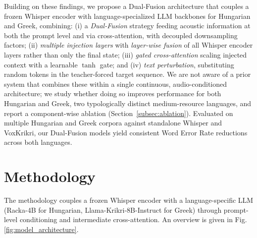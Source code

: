 \documentclass{article}
\begin{document}
Building on these findings, we propose a Dual-Fusion architecture that couples a frozen Whisper encoder with language-specialized LLM backbones for Hungarian and Greek, combining: (i) a \textit{Dual-Fusion} strategy feeding acoustic information at both the prompt level and via cross-attention, with decoupled downsampling factors; (ii) \textit{multiple injection layers} with \textit{layer-wise fusion} of all Whisper encoder layers rather than only the final state; (iii) \textit{gated cross-attention} scaling injected context with a learnable $\tanh$ gate; and (iv) \textit{text perturbation}, substituting random tokens in the teacher-forced target sequence. We are not aware of a prior system that combines these within a single continuous, audio-conditioned architecture; we study whether doing so improves performance for both Hungarian and Greek, two typologically distinct medium-resource languages, and report a component-wise ablation (Section~\ref{subsec:ablation}). Evaluated on multiple Hungarian and Greek corpora against standalone Whisper and VoxKrikri, our Dual-Fusion models yield consistent Word Error Rate reductions across both languages.

\section{Methodology}

\noindent
The methodology couples a frozen Whisper encoder with a language-specific LLM (Racka-4B for Hungarian, Llama-Krikri-8B-Instruct for Greek) through prompt-level conditioning and intermediate cross-attention. An overview is given in Fig. \ref{fig:model_architecture}.
\end{document}
